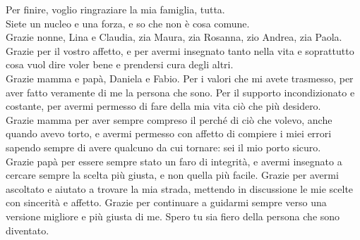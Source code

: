 \vspace{5mm}
\noindent
Per finire, voglio ringraziare la mia famiglia, tutta.\\
Siete un nucleo e una forza, e so che non è cosa comune. \\
Grazie nonne, Lina e Claudia, zia Maura, zia Rosanna, zio Andrea, zia Paola. Grazie per il vostro affetto, e per avermi insegnato tanto nella vita e soprattutto cosa vuol dire voler bene e prendersi cura degli altri. \\
Grazie mamma e papà, Daniela e Fabio. Per i valori che mi avete trasmesso, per aver fatto veramente di me la persona che sono. Per il supporto incondizionato e costante, per avermi permesso di fare della mia vita ciò che più desidero. \\
Grazie mamma per aver sempre compreso il perché di ciò che volevo, anche quando avevo torto, e avermi permesso con affetto di compiere i miei errori sapendo sempre di avere qualcuno da cui tornare: sei il mio porto sicuro. \\
Grazie papà per essere sempre stato un faro di integrità, e avermi insegnato a cercare sempre la scelta più giusta, e non quella più facile. 
Grazie per avermi ascoltato e aiutato a trovare la mia strada, mettendo in discussione le mie scelte con sincerità e affetto. Grazie per continuare a guidarmi sempre verso una versione migliore e più giusta di me. Spero tu sia fiero della persona che sono diventato.












